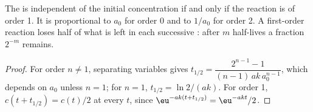 \begin{proposition}\label{prop:b1:rate-laws:half-life-test}
The  is independent of the initial concentration if and only if
the reaction is of order 1. It is proportional to $a_0$ for order 0 and
to $1/a_0$ for order 2. A first-order reaction loses half of what is left
in each successive : after $m$ half-lives a fraction $2^{-m}$
remains.
\end{proposition}

\begin{proof}
For order $n \ne 1$, separating variables gives $t_{1/2} = \dfrac{2^{n-1} -
1}{(n-1)\,ak\,a_0^{n-1}}$, which depends on $a_0$ unless $n = 1$; for
$n = 1$, $t_{1/2} = \ln2/(ak)$. For order 1, $c(t + t_{1/2}) = c(t)/2$ at
every $t$, since $\eu^{-ak(t + t_{1/2})} = \eu^{-akt}/2$.
\end{proof}

